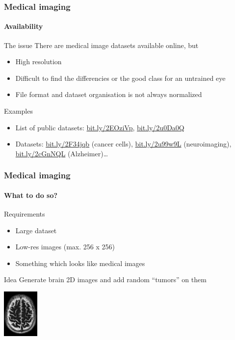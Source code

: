 \documentclass[]{beamer}
\begin{document}
\begin{frame}
  \frametitle{Medical imaging}
  \framesubtitle{Availability}
  \begin{block}{The issue}
    There are medical image datasets available online, but
    \begin{itemize}
      \item \alert{High resolution}
      \item Difficult to find the differencies or the good class for an \alert{untrained eye}
      \item File format and dataset organisation is not always \alert{normalized}
    \end{itemize}
  \end{block}
  \begin{exampleblock}{Examples}
    \begin{itemize}
      \item \alert{List of public datasets}: \url{bit.ly/2EOziVp}, \url{bit.ly/2u0Da0Q}
      \item \alert{Datasets}: \url{bit.ly/2F34jqb} (cancer cells), \url{bit.ly/2u99w9L} (neuroimaging), \url{bit.ly/2cGnNQL} (Alzheimer)\ldots{}
    \end{itemize}
  \end{exampleblock}
\end{frame}

\begin{frame}
  \frametitle{Medical imaging}
  \framesubtitle{What to do so?}
  \begin{block}{Requirements}
    \begin{itemize}
      \item Large dataset
      \item Low-res images (max. 256 x 256)
      \item Something which looks like medical images
    \end{itemize}
  \end{block}
  \begin{exampleblock}{Idea}
    Generate \alert{brain 2D images} and add random ``tumors'' on them
  \end{exampleblock}
  \begin{center}
    \includegraphics[width=1.8cm]{resources/brain_base}
  \end{center}
\end{frame}
\end{document}
